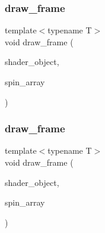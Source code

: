 \mbox{\label{classSpinArray_ac9dc81caed78947feb08a2a471e81a81}} 
\subsubsection{\texorpdfstring{draw\+\_\+frame}{draw\_frame}\hspace{0.1cm}{\footnotesize\ttfamily [2/3]}}
{\footnotesize\ttfamily template$<$typename T$>$ \\
void draw\+\_\+frame (\begin{DoxyParamCaption}\item[{\mbox{\hyperlink{classShader}{Shader}}$<$ \mbox{\hyperlink{shader__class_8hpp_a24e288e18eb7b6e01de7565001fedb60a72baef04098f035e8a320b03ad197818}{R\+E\+N\+D\+E\+R\+\_\+\+T\+Y\+P\+E\+::\+C\+U\+S\+T\+OM}} $>$ \&}]{shader\+\_\+object,  }\item[{\mbox{\hyperlink{classSpinArray}{Spin\+Array}}$<$ T $>$ \&}]{spin\+\_\+array }\end{DoxyParamCaption})\hspace{0.3cm}{\ttfamily [friend]}}

\mbox{\label{classSpinArray_ac9dc81caed78947feb08a2a471e81a81}} 
\subsubsection{\texorpdfstring{draw\+\_\+frame}{draw\_frame}\hspace{0.1cm}{\footnotesize\ttfamily [3/3]}}
{\footnotesize\ttfamily template$<$typename T$>$ \\
void draw\+\_\+frame (\begin{DoxyParamCaption}\item[{\mbox{\hyperlink{classShader}{Shader}}$<$ \mbox{\hyperlink{shader__class_8hpp_a24e288e18eb7b6e01de7565001fedb60a72baef04098f035e8a320b03ad197818}{R\+E\+N\+D\+E\+R\+\_\+\+T\+Y\+P\+E\+::\+C\+U\+S\+T\+OM}} $>$ \&}]{shader\+\_\+object,  }\item[{\mbox{\hyperlink{classSpinArray}{Spin\+Array}}$<$ T $>$ \&}]{spin\+\_\+array }\end{DoxyParamCaption})\hspace{0.3cm}{\ttfamily [friend]}}




